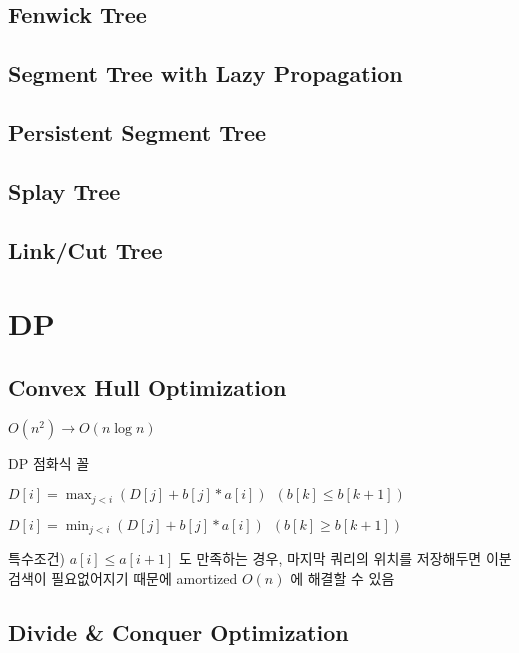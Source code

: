 \documentclass[10pt,landscape,a4paper,twocolumn]{article}
\begin{document}
\subsection{Fenwick Tree}


\subsection{Segment Tree with Lazy Propagation}


\subsection{Persistent Segment Tree}


\subsection{Splay Tree}


\subsection{Link/Cut Tree}


\section{DP}

\subsection{Convex Hull Optimization}
$O(n^{2}) \to O(n\log{n})$

DP 점화식 꼴

$D[i] = \max_{j<i}( D[j] + b[j] * a[i] ) \phantom{1} (b[k] \leq b[k+1])$

$D[i] = \min_{j<i}( D[j] + b[j] * a[i] ) \phantom{1} (b[k] \geq b[k+1])$

특수조건) $a[i] \leq a[i+1]$ 도 만족하는 경우, 마지막 쿼리의 위치를 저장해두면 이분검색이 필요없어지기 때문에 amortized $O(n)$ 에 해결할 수 있음



\subsection{Divide \& Conquer Optimization}
\end{document}
